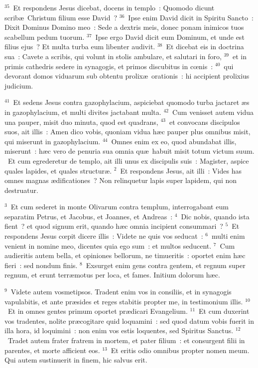 ${}^{35}$~Et respondens Jesus dicebat, docens in templo~: Quomodo dicunt scrib\ae\ Christum filium esse David~?
${}^{36}$~Ipse enim David dicit in Spiritu Sancto~: Dixit Dominus Domino meo~: Sede a dextris meis, donec ponam inimicos tuos scabellum pedum tuorum.
${}^{37}$~Ipse ergo David dicit eum Dominum, et unde est filius ejus~? Et multa turba eum libenter audivit.
${}^{38}$~Et dicebat eis in doctrina sua~: Cavete a scribis, qui volunt in stolis ambulare, et salutari in foro,
${}^{39}$~et in primis cathedris sedere in synagogis, et primos discubitus in cœnis~:
${}^{40}$~qui devorant domos viduarum sub obtentu prolix\ae\ orationis~: hi accipient prolixius judicium.


${}^{41}$~Et sedens Jesus contra gazophylacium, aspiciebat quomodo turba jactaret \ae s in gazophylacium, et multi divites jactabant multa.
${}^{42}$~Cum venisset autem vidua una pauper, misit duo minuta, quod est quadrans,
${}^{43}$~et convocans discipulos suos, ait illis~: Amen dico vobis, quoniam vidua h\ae c pauper plus omnibus misit, qui miserunt in gazophylacium.
${}^{44}$~Omnes enim ex eo, quod abundabat illis, miserunt~: h\ae c vero de penuria sua omnia qu\ae\ habuit misit totum victum suum.
~\lettrine[lines=10,image=true,loversize=0.05,lraise=-0.03]{E}{}t cum egrederetur de templo, ait illi unus ex discipulis suis~: Magister, aspice quales lapides, et quales structur\ae .
${}^{2}$~Et respondens Jesus, ait illi~: Vides has omnes magnas \ae dificationes~? Non relinquetur lapis super lapidem, qui non destruatur.


${}^{3}$~Et cum sederet in monte Olivarum contra templum, interrogabant eum separatim Petrus, et Jacobus, et Joannes, et Andreas~:
${}^{4}$~Dic nobis, quando ista fient~? et quod signum erit, quando h\ae c omnia incipient consummari~?
${}^{5}$~Et respondens Jesus cœpit dicere illis~: Videte ne quis vos seducat~:
${}^{6}$~multi enim venient in nomine meo, dicentes quia ego sum~: et multos seducent.
${}^{7}$~Cum audieritis autem bella, et opiniones bellorum, ne timueritis~: oportet enim h\ae c fieri~: sed nondum finis.
${}^{8}$~Exsurget enim gens contra gentem, et regnum super regnum, et erunt terr\ae motus per loca, et fames. Initium dolorum h\ae c.


${}^{9}$~Videte autem vosmetipsos. Tradent enim vos in consiliis, et in synagogis vapulabitis, et ante pr\ae sides et reges stabitis propter me, in testimonium illis.
${}^{10}$~Et in omnes gentes primum oportet pr\ae dicari Evangelium.
${}^{11}$~Et cum duxerint vos tradentes, nolite pr\ae cogitare quid loquamini~: sed quod datum vobis fuerit in illa hora, id loquimini~: non enim vos estis loquentes, sed Spiritus Sanctus.
${}^{12}$~Tradet autem frater fratrem in mortem, et pater filium~: et consurgent filii in parentes, et morte afficient eos.
${}^{13}$~Et eritis odio omnibus propter nomen meum. Qui autem sustinuerit in finem, hic salvus erit.


